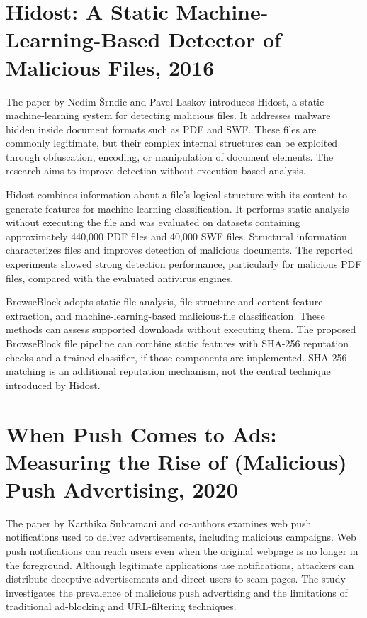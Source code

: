 \clearpage
\section{Hidost: A Static Machine-Learning-Based Detector of Malicious Files, 2016}
The paper by Nedim Šrndic and Pavel Laskov introduces Hidost, a static
machine-learning system for detecting malicious files. It addresses malware hidden
inside document formats such as PDF and SWF. These files are commonly legitimate,
but their complex internal structures can be exploited through obfuscation,
encoding, or manipulation of document elements. The research aims to improve
detection without execution-based analysis.

Hidost combines information about a file's logical structure with its content to
generate features for machine-learning classification. It performs static analysis
without executing the file and was evaluated on datasets containing approximately
440,000 PDF files and 40,000 SWF files. Structural information characterizes files
and improves detection of malicious documents. The reported experiments showed
strong detection performance, particularly for malicious PDF files, compared with
the evaluated antivirus engines.

BrowseBlock adopts static file analysis, file-structure and content-feature
extraction, and machine-learning-based malicious-file classification. These
methods can assess supported downloads without executing them. The proposed
BrowseBlock file pipeline can combine static features with SHA-256 reputation
checks and a trained classifier, if those components are implemented. SHA-256
matching is an additional reputation mechanism, not the central technique
introduced by Hidost.

\clearpage
\section{When Push Comes to Ads: Measuring the Rise of (Malicious) Push Advertising, 2020}
The paper by Karthika Subramani and co-authors examines web push notifications
used to deliver advertisements, including malicious campaigns. Web push
notifications can reach users even when the original webpage is no longer in the
foreground. Although legitimate applications use notifications, attackers can
distribute deceptive advertisements and direct users to scam pages. The study
investigates the prevalence of malicious push advertising and the limitations of
traditional ad-blocking and URL-filtering techniques.

